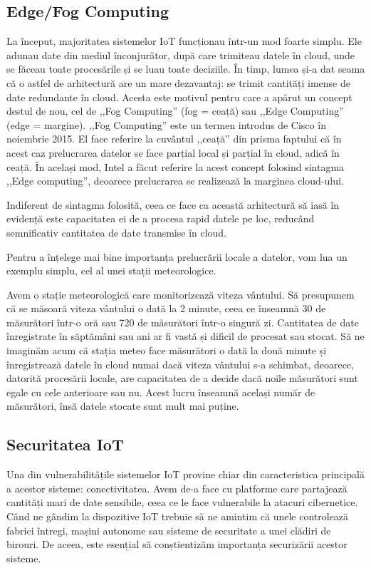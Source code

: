 \subsection{Edge/Fog Computing}
\label{sec:embed-iot-edge}

La început, majoritatea sistemelor IoT funcționau într-un mod foarte simplu.
Ele adunau date din mediul înconjurător, după care trimiteau datele în cloud, unde se făceau toate procesările și se luau toate deciziile.
În timp, lumea și-a dat seama că o astfel de arhitectură are un mare dezavantaj: se trimit cantități imense de date redundante în cloud.
Acesta este motivul pentru care a apărut un concept destul de nou, cel de ,,Fog Computing'' (fog = ceață) sau ,,Edge Computing'' (edge = margine).
,,Fog Computing'' este un termen introdus de Cisco în noiembrie 2015.
El face referire la cuvântul ,,ceață'' din prisma faptului că în acest caz prelucrarea datelor se face parțial local și parțial în cloud, adică în ceață.
În același mod, Intel a făcut referire la acest concept folosind sintagma ,,Edge computing'', deoarece prelucrarea se realizează la marginea cloud-ului.

Indiferent de sintagma folosită, ceea ce face ca această arhitectură să iasă în evidență este capacitatea ei de a procesa rapid datele pe loc, reducând semnificativ cantitatea de date transmise în cloud.

Pentru a înțelege mai bine importanța prelucrării locale a datelor, vom lua un exemplu simplu, cel al unei stații meteorologice.

Avem o stație meteorologică care monitorizează viteza vântului.
Să presupunem că se măsoară viteza vântului o dată la 2 minute, ceea ce înseamnă 30 de măsurători într-o oră sau 720 de măsurători într-o singură zi.
Cantitatea de date înregistrate în săptămâni sau ani ar fi vastă și dificil de procesat sau stocat.
 Să ne imaginăm acum că stația meteo face măsurători o dată la două minute și înregistrează datele în cloud numai dacă viteza vântului s-a schimbat, deoarece, datorită procesării locale, are capacitatea de a decide dacă noile măsurători sunt egale cu cele anterioare sau nu.
Acest lucru înseamnă același număr de măsurători, însă datele stocate sunt mult mai puține.

\subsection{Securitatea IoT}
\label{sec:embed:iot:security}

Una din vulnerabilitățile sistemelor IoT provine chiar din caracteristica principală a acestor sisteme: conectivitatea.
Avem de-a face cu platforme care partajează cantități mari de date sensibile, ceea ce le face vulnerabile la atacuri cibernetice.
Când ne gândim la dispozitive IoT trebuie să ne amintim că unele controlează fabrici întregi, mașini autonome sau sisteme de securitate a unei clădiri de birouri.
De aceea, este esențial să conștientizăm importanța securizării acestor sisteme.

